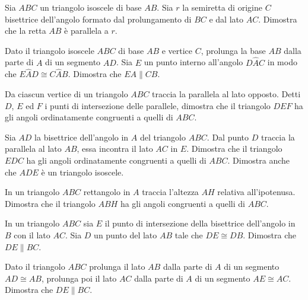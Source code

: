\begin{multicols}{2}
\begin{esercizio}
\label{ese:3.28}
Sia $ABC$ un triangolo isoscele di base $AB$. Sia $r$ la semiretta di 
origine $C$ bisettrice dell'angolo formato dal prolungamento di $BC$ 
e dal lato $AC$. Dimostra che la retta $AB$ è parallela a $r$.
\end{esercizio}

\begin{esercizio}
\label{ese:3.29}
Dato il triangolo isoscele $ABC$ di base $AB$ e vertice $C$, prolunga 
la base $AB$ dalla parte di $A$ di un segmento $AD$. Sia $E$ un punto 
interno all'angolo $D\widehat{A}C$ in modo che $E\widehat{A}D\cong 
C\widehat{A}B$. Dimostra che $EA\parallel CB$.
\end{esercizio}

\begin{esercizio}
\label{ese:3.30}
Da ciascun vertice di un triangolo $ABC$ traccia la parallela al lato 
opposto. Detti $D$, $E$ ed $F$ i punti di intersezione delle 
parallele, dimostra che il triangolo $DEF$ ha gli angoli 
ordinatamente congruenti a quelli di $ABC$.
\end{esercizio}

\begin{esercizio}
\label{ese:3.31}
Sia $AD$ la bisettrice dell'angolo in $A$ del triangolo $ABC$. Dal 
punto $D$ traccia la parallela al lato $AB$, essa incontra il lato 
$AC$ in $E$. Dimostra che il triangolo $EDC$ ha gli angoli 
ordinatamente congruenti a quelli di $ABC$. Dimostra anche che $ADE$ 
è un triangolo isoscele.
\end{esercizio}

\begin{esercizio}
\label{ese:3.32}
In un triangolo $ABC$ rettangolo in $A$ traccia l'altezza $AH$ 
relativa all'ipotenusa. Dimostra che il triangolo $ABH$ ha gli angoli 
congruenti a quelli di $ABC$.
\end{esercizio}

\begin{esercizio}
\label{ese:3.35}
In un triangolo $ABC$ sia $E$ il punto di intersezione della 
bisettrice dell'angolo in $B$ con il lato $AC$. Sia $D$ un punto del 
lato $AB$ tale che $DE\cong DB$. Dimostra che $DE\parallel BC$.
\end{esercizio}

\begin{esercizio}
\label{ese:3.37}
Dato il triangolo $ABC$ prolunga il lato $AB$ dalla parte di $A$ di 
un segmento $AD\cong AB$, prolunga poi il lato $AC$ dalla parte di $A$ 
di un segmento $AE\cong AC$. Dimostra che $DE\parallel BC$.
\end{esercizio}


\end{multicols}
